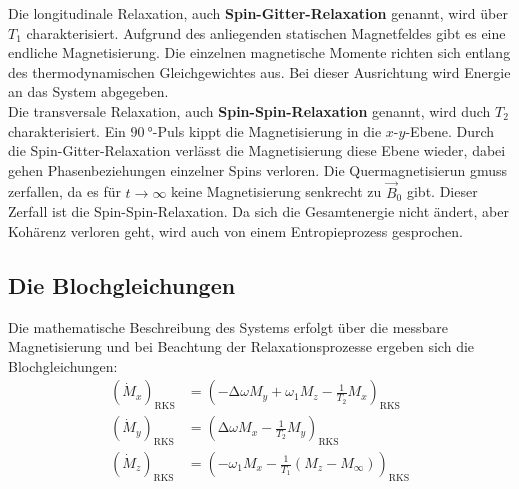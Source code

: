         \noindent Die longitudinale Relaxation, auch \textbf{Spin-Gitter-Relaxation} genannt, wird über $T_1$ charakterisiert. Aufgrund des anliegenden statischen Magnetfeldes gibt es eine 
        endliche Magnetisierung. Die einzelnen magnetische Momente richten sich entlang des thermodynamischen Gleichgewichtes aus. Bei dieser Ausrichtung wird Energie an das System abgegeben. \\

        \noindent Die transversale Relaxation, auch \textbf{Spin-Spin-Relaxation} genannt, wird duch $T_2$ charakterisiert. Ein $\SI{90}{\degree}$-Puls kippt die Magnetisierung in die $x$-$y$-Ebene. 
        Durch die Spin-Gitter-Relaxation verlässt die Magnetisierung diese Ebene wieder, dabei gehen Phasenbeziehungen einzelner Spins verloren. Die Quermagnetisierun gmuss zerfallen, da es für $t \to \infty$ 
        keine Magnetisierung senkrecht zu $\vec{B}_0$ gibt. Dieser Zerfall ist die Spin-Spin-Relaxation. Da sich die Gesamtenergie nicht ändert, aber Kohärenz verloren geht, wird auch von einem Entropieprozess 
        gesprochen. 

    \subsection{Die Blochgleichungen}

        \noindent Die mathematische Beschreibung des Systems erfolgt über die messbare Magnetisierung und bei Beachtung der Relaxationsprozesse ergeben sich die Blochgleichungen: 
        \begin{align*}
            \left(\dot{M}_x\right)_{\text{RKS}} & = \left(- \increment \omega M_y + \omega_1M_z - \frac{1}{T_2} M_x\right)_{\text{RKS}} \\
            \left(\dot{M}_y\right)_{\text{RKS}} & = \left(\increment \omega M_x - \frac{1}{T_2} M_y\right)_{\text{RKS}} \\
            \left(\dot{M}_z\right)_{\text{RKS}} & = \left( - \omega_1 M_x - \frac{1}{T_1}(M_z - M_\infty)\right)_{\text{RKS}} 
        \end{align*} 

